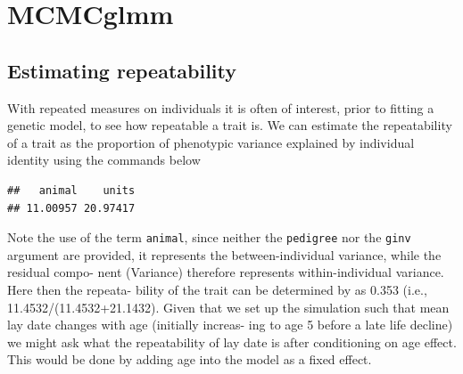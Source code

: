 \documentclass[
  12pt,
]{book}
\newenvironment{Shaded}{\begin{snugshade}}{\end{snugshade}}
\newcommand{\AttributeTok}[1]{\textcolor[rgb]{0.77,0.63,0.00}{#1}}
\newcommand{\ConstantTok}[1]{\textcolor[rgb]{0.00,0.00,0.00}{#1}}
\newcommand{\DecValTok}[1]{\textcolor[rgb]{0.00,0.00,0.81}{#1}}
\newcommand{\FloatTok}[1]{\textcolor[rgb]{0.00,0.00,0.81}{#1}}
\newcommand{\FunctionTok}[1]{\textcolor[rgb]{0.00,0.00,0.00}{#1}}
\newcommand{\NormalTok}[1]{#1}
\newcommand{\OtherTok}[1]{\textcolor[rgb]{0.56,0.35,0.01}{#1}}
\newcommand{\SpecialCharTok}[1]{\textcolor[rgb]{0.00,0.00,0.00}{#1}}
\begin{document}
\hypertarget{mcmcglmm-3}{%
\section{MCMCglmm}\label{mcmcglmm-3}}

\hypertarget{estimating-repeatability-1}{%
\subsection{Estimating repeatability}\label{estimating-repeatability-1}}

With repeated measures on individuals it is often of interest, prior to fitting a genetic model, to see how repeatable a trait is. We can estimate the repeatability of a trait as the proportion of phenotypic variance explained by individual identity using the commands below

\begin{Shaded}
\end{Shaded}

\begin{verbatim}
##   animal    units 
## 11.00957 20.97417
\end{verbatim}

Note the use of the term \texttt{animal}, since neither the \texttt{pedigree} nor the \texttt{ginv} argument are provided, it represents the between-individual variance, while the residual compo- nent (Variance) therefore represents within-individual variance. Here then the repeata- bility of the trait can be determined by as 0.353 (i.e., 11.4532/(11.4532+21.1432). Given that we set up the simulation such that mean lay date changes with age (initially increas- ing to age 5 before a late life decline) we might ask what the repeatability of lay date is after conditioning on age effect. This would be done by adding age into the model as a fixed effect.
\end{document}
